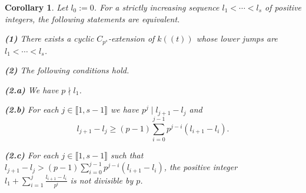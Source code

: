 \documentclass[11pt]{amsart}
\newtheorem{corollary}[theorem]{Corollary}
\begin{document}
\begin{corollary}\label{C3}
Let $l_0:=0$. For a strictly increasing sequence $l_1<\cdots<l_s$ of positive integers, the following statements are equivalent.

\medskip
{\bf (1)} There exists a cyclic $C_{p^s}$-extension of $k((t))$ whose lower jumps are $l_1<\cdots<l_s$.

\smallskip
{\bf (2)} The following conditions hold.

\medskip\noindent
{\bf (2.a)} We have $p\nmid l_1$.

\smallskip\noindent
{\bf (2.b)} For each $j\in\llbracket1,s-1\rrbracket$ we have $p^j\mid l_{j+1}-l_j$ and
$$l_{j+1}-l_j\ge (p-1)\sum_{i=0}^{j-1} p^{j-i}(l_{i+1}-l_i).$$

\noindent
{\bf (2.c)} For each $j\in\llbracket1,s-1\rrbracket$ such that $l_{j+1}-l_j> (p-1)\sum_{i=0}^{j-1} p^{j-i}(l_{i+1}-l_i)$, the positive integer $l_1+\sum_{i=1}^{j}\frac{l_{i+1}-l_i}{p^i}$ is not divisible by $p$.
\end{corollary}
\end{document}
